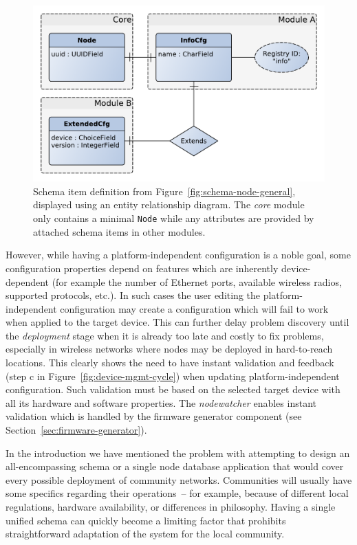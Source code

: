 \documentclass[5p,sort&compress]{elsarticle}
\newcommand{\nodewatcher}{\textit{nodewatcher}}
\begin{document}
\begin{figure}
  \centering
  \includegraphics[scale=0.47]{figures/registry-example-models.pdf}
  \caption{Schema item definition from Figure~\ref{fig:schema-node-general}, displayed using an entity relationship diagram.
  The \textit{core} module only contains a minimal \texttt{Node} while any attributes are provided by attached schema items in other modules.}
  \label{fig:registry-schema-example}
\end{figure}

However, while having a platform-independent configuration is a noble goal, some configuration properties depend on features which are inherently device-dependent (for example the number of Ethernet ports, available wireless radios, supported protocols, etc.).
In such cases the user editing the platform-independent configuration may create a configuration which will fail to work when applied to the target device.
This can further delay problem discovery until the \textit{deployment} stage when it is already too late and costly to fix problems, especially in wireless networks where nodes may be deployed in hard-to-reach locations.
This clearly shows the need to have instant validation and feedback (step c in Figure~\ref{fig:device-mgmt-cycle}) when updating platform-independent configuration.
Such validation must be based on the selected target device with all its hardware and software properties.
The \nodewatcher{} enables instant validation which is handled by the firmware generator component (see Section~\ref{sec:firmware-generator}).

In the introduction we have mentioned the problem with attempting to design an all-encompassing schema or a single node database application that would cover every possible deployment of community networks.
Communities will usually have some specifics regarding their operations~-- for example, because of different local regulations, hardware availability, or differences in philosophy.
Having a single unified schema can quickly become a limiting factor that prohibits straightforward adaptation of the system for the local community.
\end{document}
